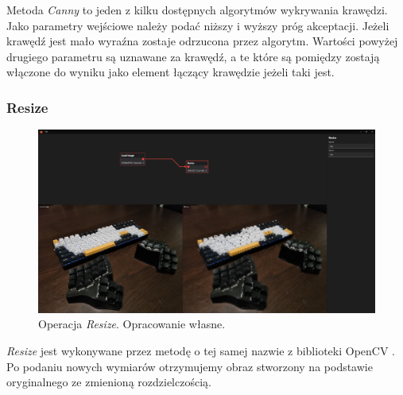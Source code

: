 Metoda \textit{Canny} \cite{canny} to jeden z kilku dostępnych algorytmów wykrywania krawędzi. Jako parametry wejściowe należy podać niższy i wyższy próg akceptacji.
Jeżeli krawędź jest mało wyraźna zostaje odrzucona przez algorytm. 
Wartości powyżej drugiego parametru są uznawane za krawędź, a te które są pomiędzy zostają włączone do wyniku jako element łączący krawędzie jeżeli taki jest. 

\subsubsection{Resize}

\begin{figure}[H]
    \centering
    \includegraphics[width=1\linewidth]{images/Picture26.png}
    \caption{Operacja \textit{Resize}. Opracowanie własne.}
    \label{fig:resize}
\end{figure} 

\textit{Resize} jest wykonywane przez metodę o tej samej nazwie z biblioteki OpenCV \cite{resize}. Po podaniu nowych wymiarów otrzymujemy obraz stworzony na podstawie oryginalnego ze zmienioną rozdzielczością.